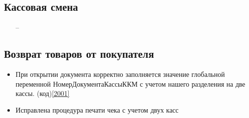 \subsection{Кассовая смена}

\begin{itemize}
	\item [--]
\end{itemize}



\subsection{Возврат товаров от покупателя}
\begin{itemize}
	\item При открытии документа корректно заполняется значение глобальной переменной НомерДокументаКассыККМ
	 с учетом нашего разделения на две кассы. (код)\ref{2001}
\item Исправлена процедура печати чека с учетом двух касс

\end{itemize}


